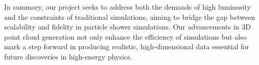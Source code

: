 In summary, our project seeks to address both the demands of high luminosity and the constraints of traditional simulations, aiming to bridge the gap between scalability and fidelity in particle shower simulations. Our advancements in 3D point cloud generation not only enhance the efficiency of simulations but also mark a step forward in producing realistic, high-dimensional data essential for future discoveries in high-energy physics.



